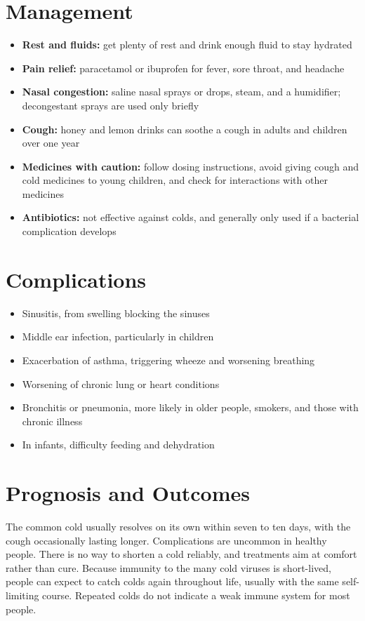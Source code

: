 \section*{Management}
\begin{itemize}
    \item \textbf{Rest and fluids:} get plenty of rest and drink enough fluid to stay hydrated
    \item \textbf{Pain relief:} paracetamol or ibuprofen for fever, sore throat, and headache
    \item \textbf{Nasal congestion:} saline nasal sprays or drops, steam, and a humidifier; decongestant sprays are used only briefly
    \item \textbf{Cough:} honey and lemon drinks can soothe a cough in adults and children over one year
    \item \textbf{Medicines with caution:} follow dosing instructions, avoid giving cough and cold medicines to young children, and check for interactions with other medicines
    \item \textbf{Antibiotics:} not effective against colds, and generally only used if a bacterial complication develops
\end{itemize}

\section*{Complications}
\begin{itemize}
    \item Sinusitis, from swelling blocking the sinuses
    \item Middle ear infection, particularly in children
    \item Exacerbation of asthma, triggering wheeze and worsening breathing
    \item Worsening of chronic lung or heart conditions
    \item Bronchitis or pneumonia, more likely in older people, smokers, and those with chronic illness
    \item In infants, difficulty feeding and dehydration
\end{itemize}

\section*{Prognosis and Outcomes}
The common cold usually resolves on its own within seven to ten days, with the cough occasionally lasting longer. Complications are uncommon in healthy people. There is no way to shorten a cold reliably, and treatments aim at comfort rather than cure. Because immunity to the many cold viruses is short-lived, people can expect to catch colds again throughout life, usually with the same self-limiting course. Repeated colds do not indicate a weak immune system for most people.

